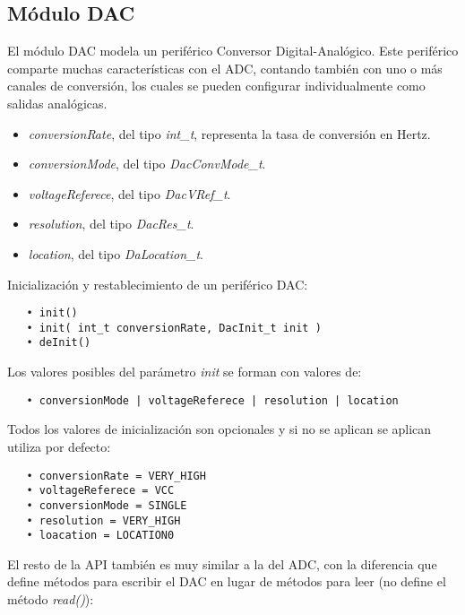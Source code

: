 \subsection{Módulo DAC}

El módulo DAC modela un periférico Conversor Digital-Analógico. Este periférico comparte muchas características con el ADC, contando también con uno o más canales de conversión, los cuales se pueden configurar individualmente como salidas analógicas.


\begin{itemize}
\item
\emph{conversionRate}, del tipo \emph{int\_t}, representa la tasa de conversión en Hertz.
\item
\emph{conversionMode}, del tipo \emph{DacConvMode\_t}.
\item
\emph{voltageReferece}, del tipo \emph{DacVRef\_t}.
\item
\emph{resolution}, del tipo \emph{DacRes\_t}.
\item
\emph{location}, del tipo \emph{DaLocation\_t}.
\end{itemize}


Inicialización y restablecimiento de un periférico DAC:

\begin{verbatim}
   • init()
   • init( int_t conversionRate, DacInit_t init )
   • deInit()
\end{verbatim}

Los valores posibles del parámetro \emph{init} se forman con valores de:

\begin{verbatim}
   • conversionMode | voltageReferece | resolution | location
\end{verbatim}

Todos los valores de inicialización son opcionales y si no se aplican se aplican utiliza por defecto:

\begin{verbatim}
   • conversionRate = VERY_HIGH
   • voltageReferece = VCC
   • conversionMode = SINGLE
   • resolution = VERY_HIGH
   • loacation = LOCATION0
\end{verbatim}

El resto de la API también es muy similar a la del ADC, con la diferencia que define métodos para escribir el DAC en lugar de métodos para leer (no define el método \emph{read()}):

